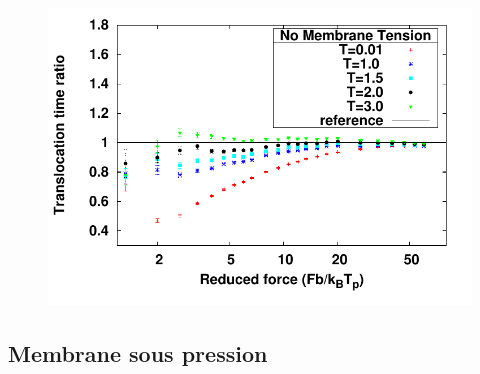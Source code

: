\begin{figure}[H]
\begin{center}
\label{membrane non tendue}
\end{center}
\end{figure}

\begin{figure}[H]
\begin{center}
\includegraphics[width=1\textwidth]{notension.pdf} 
\label{membranenontendueevoltemp}
\end{center}
\end{figure}

\subsection{Membrane sous pression}

